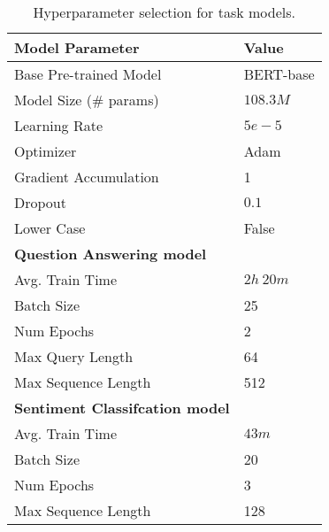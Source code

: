 \vspace{.5cm}
\begin{table}[htb]
	\small
	\centering
	\begin{tabular}{ll}
		\toprule
		\textbf{Model Parameter} & \textbf{Value} \\
		\midrule
		Base Pre-trained Model & BERT-base \\
		Model Size (\# params) & $108.3M$ \\
		
		Learning Rate & $5e-5$ \\
		Optimizer & Adam \\
		Gradient Accumulation & 1 \\
		Dropout & $0.1$ \\
		Lower Case & False \\
		\midrule
		\textbf{Question Answering model} & {} \\
		Avg. Train Time & $2h\ 20m$ \\
		Batch Size & 25 \\
		Num Epochs & 2 \\
		Max Query Length & 64 \\
		Max Sequence Length & 512 \\
		\midrule
		\textbf{Sentiment Classifcation model} & {} \\
		Avg. Train Time & $43m$ \\
		Batch Size & 20 \\
		Num Epochs & 3 \\
		Max Sequence Length & 128 \\
		\bottomrule
	\end{tabular}
	\caption{\label{model-hyperparams}
		Hyperparameter selection for task models.
	}
\end{table}